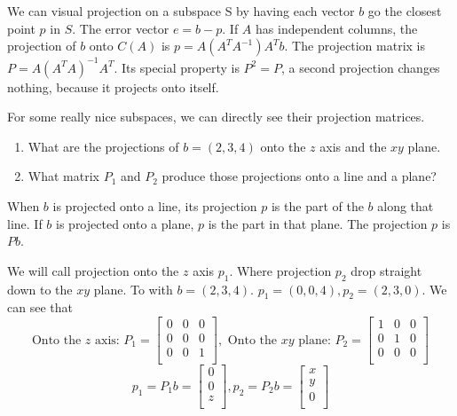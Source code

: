 We can visual projection on a subspace S by having each vector \(b\) go the closest point \(p\) in \(S\). The error vector \(e = b - p\). If \(A\) has independent columns, the projection of \(b\) onto \(C(A)\) is \(p = A(A^{T}A^{-1})A^{T}b\). The projection matrix is \(P = A(A^{T}A)^{-1}A^T\). Its special property is \(P^2 = P\), a second projection changes nothing, because it projects onto itself. 

For some really nice subspaces, we can directly see their projection matrices. 
\begin{enumerate}
    \item What are the projections of \(b = (2, 3, 4)\) onto the \(z\) axis and the \(xy\) plane.
    \item What matrix \(P_1\) and \(P_2\) produce those projections onto a line and a plane?     
\end{enumerate}

When \(b\) is projected onto a line, its projection \(p\) is the part of the \(b\) along that line. If \(b\) is projected onto a plane, \(p\) is the part in that plane. The projection \(p\) is \(Pb\). 

We will call projection onto the \(z\) axis \(p_1\). Where projection \(p_2\) drop straight down to the \(xy\) plane. To with \(b = (2, 3, 4)\). \(p_1 = (0, 0, 4), p_2 = (2, 3, 0)\). 
We can see that 
\[
    \text{Onto the \(z\) axis: }
    P_1 = 
    \begin{bmatrix}
        0 & 0 & 0  \\
        0 & 0 & 0  \\
        0 & 0 & 1  \\
    \end{bmatrix}
    , \text{ Onto the \(xy\) plane: }
    P_2 = 
    \begin{bmatrix}
        1 & 0 & 0  \\
        0 & 1 & 0  \\
        0 & 0 & 0  \\
    \end{bmatrix}
\]      
\[
    p_1 = P_{1}b = 
    \begin{bmatrix}
         0 \\
         0 \\
         z \\
    \end{bmatrix},
    p_2 = P_{2}b = 
    \begin{bmatrix}
         x \\
         y \\
         0 \\
    \end{bmatrix}
\]

